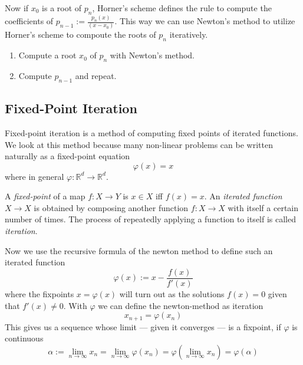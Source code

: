 Now if \(x_0\) is a root of \(p_n\), Horner's scheme defines the rule to compute the coefficients of \(p_{n-1} := \frac{p_n(x)}{(x-x_0)}\).
This way we can use Newton's method to utilize Horner's scheme to compoute the roots of \(p_n\) iteratively.
\begin{enumerate}
   \item Compute a root \(x_0\) of \(p_n\) with Newton's method.
   \item Compute \(p_{n-1}\) and repeat.
\end{enumerate}



\subsection{Fixed-Point Iteration}
Fixed-point iteration is a method of computing fixed points of iterated functions.
We look at this method because many non-linear problems can be written naturally as a fixed-point equation
\[\varphi(x) = x\]
where in general \(\varphi: \mathbb{R}^d \to \mathbb{R}^d\).

A \emph{fixed-point} of a map \(f: X \to Y\) is \(x \in X\) iff \(f(x) = x\).
An \emph{iterated function} \(X \to X\) is obtained by composing another function \(f: X \to X\) with itself a certain number of times.
The process of repeatedly applying a function to itself is called \emph{iteration}.

Now we use the recursive formula of the newton method to define such an iterated function
\[\varphi(x) := x - \frac{f(x)}{f'(x)}\]
where the fixpoints \(x = \varphi(x)\) will turn out as the solutions \(f(x) = 0\) given that \(f'(x) \neq 0\).
With \(\varphi\) we can define the newton-method as iteration
\[x_{n+1} = \varphi(x_n)\]
This gives us a sequence whose limit --- given it converges --- is a fixpoint, if \(\varphi\) is continuous
\[\alpha := \lim_{n \to \infty} x_n = \lim_{n \to \infty} \varphi(x_n) = \varphi\left(\lim_{n \to \infty} x_n\right) = \varphi(\alpha)\]

